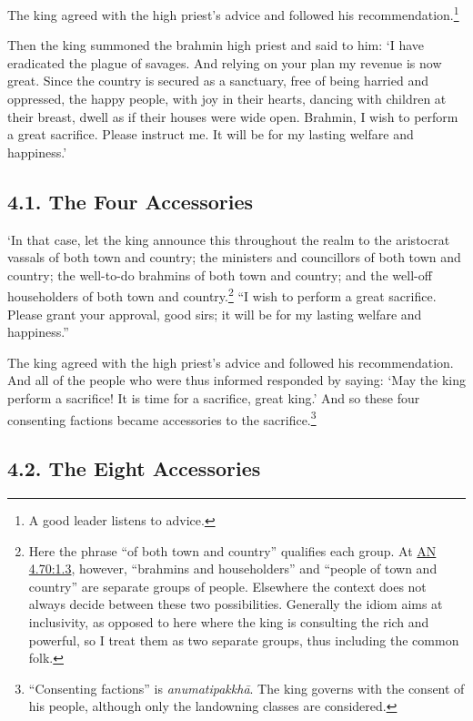 \documentclass[12pt,openany]{book}%
\begin{document}
The king agreed with the high priest’s advice and followed his recommendation.\footnote{A good leader listens to advice. } 

Then the king summoned the brahmin high priest and said to him: ‘I have eradicated the plague of savages. And relying on your plan my revenue is now great. Since the country is secured as a sanctuary, free of being harried and oppressed, the happy people, with joy in their hearts, dancing with children at their breast, dwell as if their houses were wide open. Brahmin, I wish to perform a great sacrifice. Please instruct me. It will be for my lasting welfare and happiness.’ 

\subsection*{4.1. The Four Accessories }

‘In that case, let the king announce this throughout the realm to the aristocrat vassals of both town and country; the ministers and councillors of both town and country; the well-to-do brahmins of both town and country; and the well-off householders of both town and country.\footnote{Here the phrase “of both town and country” qualifies each group. At \href{https://suttacentral.net/an4.70/en/sujato\#1.3}{AN 4.70:1.3}, however, “brahmins and householders” and “people of town and country” are separate groups of people. Elsewhere the context does not always decide between these two possibilities. Generally the idiom aims at inclusivity, as opposed to here where the king is consulting the rich and powerful, so I treat them as two separate groups, thus including the common folk. } “I wish to perform a great sacrifice. Please grant your approval, good sirs; it will be for my lasting welfare and happiness.” 

The king agreed with the high priest’s advice and followed his recommendation. And all of the people who were thus informed responded by saying: ‘May the king perform a sacrifice! It is time for a sacrifice, great king.’ And so these four consenting factions became accessories to the sacrifice.\footnote{“Consenting factions” is \textit{\textsanskrit{anumatipakkhā}}. The king governs with the consent of his people, although only the landowning classes are considered. } 

\subsection*{4.2. The Eight Accessories }
\end{document}
